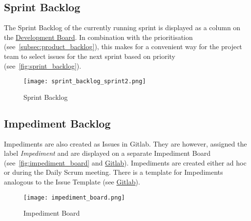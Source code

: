 \subsection{Sprint Backlog}\label{subsec:sprint-backlog}
The Sprint Backlog of the currently running sprint is displayed as a column on the \href{https://gitlab.ti.bfh.ch/decibel-threshold-event-displayer/decibel-threshold-event-displayer/-/boards/2832}{Development Board}.
In combination with the prioritisation (see\ \ref{subsec:product_backlog}), this makes for a convenient way for the project team to select issues for the next sprint based on priority (see\ \autoref{fig:sprint_backlog}).
\begin{figure}[H]
    \centering
    \texttt{[image: sprint\_backlog\_sprint2.png]}
    \caption{Sprint Backlog}\label{fig:sprint_backlog}
\end{figure}
\subsection{Impediment Backlog}\label{subsec:impediment_board}
Impediments are also created as Issues in Gitlab.
They are however, assigned the label \textit{Impediment} and are displayed on a separate Impediment Board (see\ \autoref{fig:impediment_board} and \href{https://gitlab.ti.bfh.ch/decibel-threshold-event-displayer/decibel-threshold-event-displayer/-/boards/2834?label_name[]=impediment}{Gitlab}).
Impediments are created either ad hoc or during the Daily Scrum meeting.
There is a template for Impediments analogous to the Issue Template (see \href{https://gitlab.ti.bfh.ch/decibel-threshold-event-displayer/decibel-threshold-event-displayer/-/blob/main/.gitlab/issue_templates/Impediment.md}{Gitlab}).
\begin{figure}[H]
    \centering
    \texttt{[image: impediment\_board.png]}
    \caption{Impediment Board}\label{fig:impediment_board}
\end{figure}